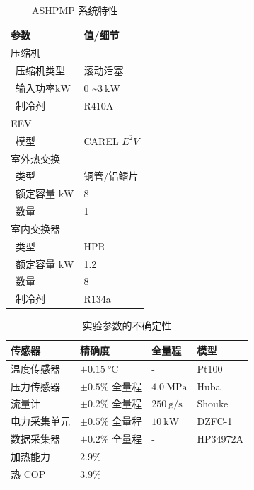 \begin{table}[ht]
	\centering
	\caption{ASHPMP 系统特性}
	\begin{tabular}{@{}ll@{}}
		\toprule
		参数 	& 值/细节 \\ \midrule
		压缩机  & \\
		~压缩机类型  & 滚动活塞 \\
		~输入功率$\unit{\kW} $  & 0 \textasciitilde $\qty{3}{\kW} $ \\
		~制冷剂  & R410A \\
		EEV  & \\
		~模型  & CAREL $E^2 V$ \\
		室外热交换  & \\
		~类型  & 铜管/铝鳍片\\
		~额定容量 $\unit{\kW}$  & 8 \\
		~数量  & 1 \\
		室内交换器  & \\
		~类型  & HPR\\
		~额定容量 $\unit{\kW}$  & 1.2 \\
		~数量  & 8 \\
		~制冷剂  & R134a \\ \bottomrule
	\end{tabular}
	\label{T:2}
\end{table}

\begin{table}[ht]
	\centering
	\caption{实验参数的不确定性}
	\begin{tabular}{@{}llll@{}}
		\toprule
		传感器 & 精确度 & 全量程 & 模型 \\ \midrule
		温度传感器 & $\pm\qty{0.15}{\degreeCelsius} $ & - & Pt100 \\
		压力传感器 & $\pm 0.5\%$ 全量程 & $\qty{4.0}{\MPa} $ & Huba \\
		流量计 & $\pm 0.2\%$ 全量程 & $\qty{250}{\g/\s} $ & Shouke \\
		电力采集单元 & $\pm 0.5\%$ 全量程 & $\qty{10}{\kW} $ & DZFC-1 \\
		数据采集器 & $\pm 0.2\%$ 全量程 & - & HP34972A \\
		加热能力 & $2.9\%$ & & \\
		热 COP & $3.9\%$ & & \\ \bottomrule
	\end{tabular}
	\label{T:3}
\end{table}
